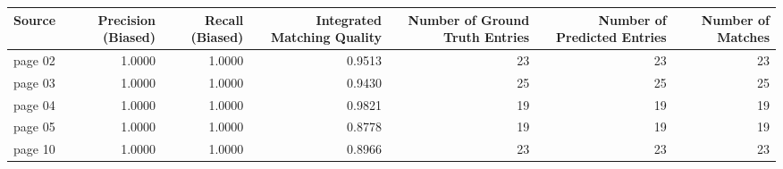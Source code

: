 \begin{tabular}{lrrrrrr}
\toprule
Source & Precision (Biased) & Recall (Biased) & Integrated Matching Quality & Number of Ground Truth Entries & Number of Predicted Entries & Number of Matches \\
\midrule
page 02 & 1.0000 & 1.0000 & 0.9513 & 23 & 23 & 23 \\
page 03 & 1.0000 & 1.0000 & 0.9430 & 25 & 25 & 25 \\
page 04 & 1.0000 & 1.0000 & 0.9821 & 19 & 19 & 19 \\
page 05 & 1.0000 & 1.0000 & 0.8778 & 19 & 19 & 19 \\
page 10 & 1.0000 & 1.0000 & 0.8966 & 23 & 23 & 23 \\
\bottomrule
\end{tabular}
